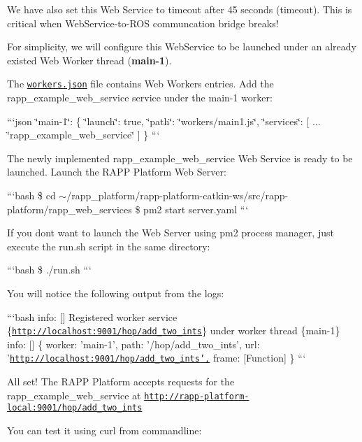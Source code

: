 We have also set this Web Service to timeout after 45 seconds ({\ttfamily timeout}). This is critical when Web\-Service-\/to-\/\-R\-O\-S communcation bridge breaks!

For simplicity, we will configure this Web\-Service to be launched under an already existed Web Worker thread ({\bfseries main-\/1}).

The \href{https://github.com/rapp-project/rapp-platform/blob/master/rapp_web_services/config/services/workers.json}{\tt workers.\-json} file contains Web Workers entries. Add the {\ttfamily rapp\-\_\-example\-\_\-web\-\_\-service} service under the {\ttfamily main-\/1} worker\-:

```json \char`\"{}main-\/1\char`\"{}\-: \{ \char`\"{}launch\char`\"{}\-: true, \char`\"{}path\char`\"{}\-: \char`\"{}workers/main1.\-js\char`\"{}, \char`\"{}services\char`\"{}\-: \mbox{[} ... \char`\"{}rapp\-\_\-example\-\_\-web\-\_\-service\char`\"{} \mbox{]} \} ```

The newly implemented {\ttfamily rapp\-\_\-example\-\_\-web\-\_\-service} Web Service is ready to be launched. Launch the R\-A\-P\-P Platform Web Server\-:

```bash \$ cd $\sim$/rapp\-\_\-platform/rapp-\/platform-\/catkin-\/ws/src/rapp-\/platform/rapp\-\_\-web\-\_\-services \$ pm2 start server.\-yaml ```

If you dont want to launch the Web Server using pm2 process manager, just execute the {\ttfamily run.\-sh} script in the same directory\-:

```bash \$ ./run.sh ```

You will notice the following output from the logs\-:

```bash info\-: \mbox{[}\mbox{]} Registered worker service \{\href{http://localhost:9001/hop/add_two_ints}{\tt http\-://localhost\-:9001/hop/add\-\_\-two\-\_\-ints}\} under worker thread \{main-\/1\} info\-: \mbox{[}\mbox{]} \{ worker\-: 'main-\/1', path\-: '/hop/add\-\_\-two\-\_\-ints', url\-: '\href{http://localhost:9001/hop/add_two_ints',}{\tt http\-://localhost\-:9001/hop/add\-\_\-two\-\_\-ints',} frame\-: \mbox{[}Function\mbox{]} \} ```

All set! The R\-A\-P\-P Platform accepts requests for the {\ttfamily rapp\-\_\-example\-\_\-web\-\_\-service} at {\ttfamily \href{http://rapp-platform-local:9001/hop/add_two_ints}{\tt http\-://rapp-\/platform-\/local\-:9001/hop/add\-\_\-two\-\_\-ints}}

You can test it using {\ttfamily curl} from commandline\-:

